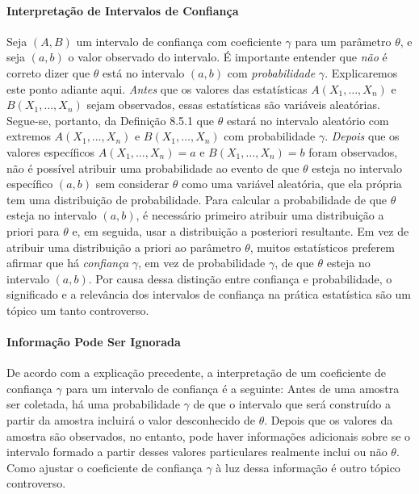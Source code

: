 \paragraph{Interpretação de Intervalos de Confiança} Seja $(A, B)$ um intervalo de confiança com coeficiente $\gamma$ para um parâmetro $\theta$, e seja $(a, b)$ o valor observado do intervalo. É importante entender que \textit{não} é correto dizer que $\theta$ está no intervalo $(a, b)$ com \textit{probabilidade} $\gamma$. Explicaremos este ponto adiante aqui. \textit{Antes} que os valores das estatísticas $A(X_1, \dots, X_n)$ e $B(X_1, \dots, X_n)$ sejam observados, essas estatísticas são variáveis aleatórias. Segue-se, portanto, da Definição 8.5.1 que $\theta$ estará no intervalo aleatório com extremos $A(X_1, \dots, X_n)$ e $B(X_1, \dots, X_n)$ com probabilidade $\gamma$. \textit{Depois} que os valores específicos $A(X_1, \dots, X_n) = a$ e $B(X_1, \dots, X_n) = b$ foram observados, não é possível atribuir uma probabilidade ao evento de que $\theta$ esteja no intervalo específico $(a, b)$ sem considerar $\theta$ como uma variável aleatória, que ela própria tem uma distribuição de probabilidade. Para calcular a probabilidade de que $\theta$ esteja no intervalo $(a, b)$, é necessário primeiro atribuir uma distribuição a priori para $\theta$ e, em seguida, usar a distribuição a posteriori resultante. Em vez de atribuir uma distribuição a priori ao parâmetro $\theta$, muitos estatísticos preferem afirmar que há \textit{confiança} $\gamma$, em vez de probabilidade $\gamma$, de que $\theta$ esteja no intervalo $(a, b)$. Por causa dessa distinção entre confiança e probabilidade, o significado e a relevância dos intervalos de confiança na prática estatística são um tópico um tanto controverso.

\paragraph{Informação Pode Ser Ignorada} De acordo com a explicação precedente, a interpretação de um coeficiente de confiança $\gamma$ para um intervalo de confiança é a seguinte: Antes de uma amostra ser coletada, há uma probabilidade $\gamma$ de que o intervalo que será construído a partir da amostra incluirá o valor desconhecido de $\theta$. Depois que os valores da amostra são observados, no entanto, pode haver informações adicionais sobre se o intervalo formado a partir desses valores particulares realmente inclui ou não $\theta$. Como ajustar o coeficiente de confiança $\gamma$ à luz dessa informação é outro tópico controverso.

